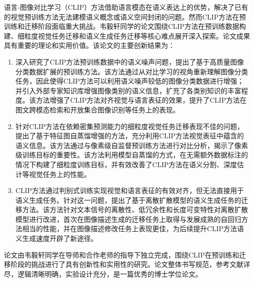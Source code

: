 
\begin{comments}

语言-图像对比学习（CLIP）方法借助语言模态在语义表达上的优势，解决了已有的视觉预训练方法无法建模语义概念或语义空间封闭的问题。然而CLIP方法在预训练和迁移阶段面临重大挑战。韦毅轩同学的论文围绕CLIP方法在预训练数据构建、细粒度视觉任务迁移和语义生成任务迁移等核心难点展开深入探索。论文成果具有重要的理论和实用价值。该论文的主要创新结果为：

\begin{enumerate}
    \item 深入研究了CLIP方法预训练数据中的语义噪声问题，提出了基于高质量图像分类数据扩展的预训练方法。该方法通过从对比学习的视角重新理解图像分类任务，因此使得CLIP方法可以利用语义噪声较低的图像分类数据进行增强；并引入外部专家知识库增强图像类别的语义信息，扩充了各类别知识的丰富程度。该方法增强了CLIP方法对齐视觉与语言表征的效果，提升了CLIP方法在图文跨模态检索和开放集合图像识别等任务上的表现。
    \item 针对CLIP方法在依赖密集预测能力的细粒度视觉任务迁移表现不佳的问题，提出了基于特征图自蒸馏增强的方法，充分利用CLIP方法视觉表征中蕴含的语义信息。该方法通过与像素级自监督预训练方法进行对比分析，揭示了像素级训练目标的重要性。该方法利用模型自蒸馏的方式，在无需额外数据标注的情况下构建了细粒度训练目标，并有效改善了CLIP方法在语义分割、深度估计等视觉任务上的性能。
    \item CLIP方法通过判别式训练实现视觉和语言表征的有效对齐，但无法直接用于语义生成任务。针对这一问题，提出了基于离散扩散模型的语义生成任务的迁移方法。该方法针对文本信号的离散性、低冗余性和长度可变特性对离散扩散模型进行改进，首次在图像描述生成的迁移任务上取得与发展成熟的自回归方法相当的性能，并在图像描述修改任务上表现更佳，为后续提升CLIP方法语义生成速度开辟了新途径。
\end{enumerate}

论文由韦毅轩同学在导师和合作老师的指导下独立完成，围绕CLIP在预训练和迁移阶段的挑战进行了具有创新性和实用性的研究。论文整体书写规范，参考文献详尽，逻辑清晰明确，实验设计充分，是一篇优秀的博士学位论文。

\end{comments}
